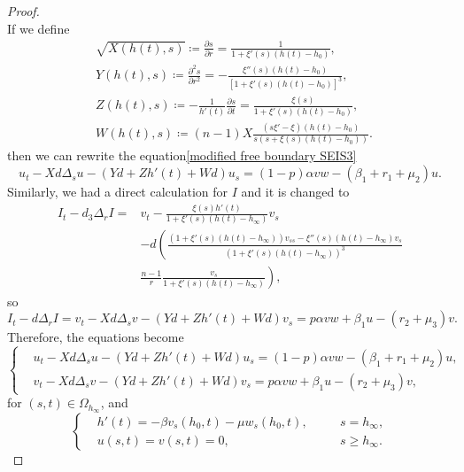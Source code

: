 \documentclass[11pt]{amsart}
\numberwithin{equation}{section}
\theoremstyle{plain}
\theoremstyle{definition}
\begin{document}
\begin{proof}
\begin{equation}
\end{equation}
If we define
\begin{equation*}
	\begin{aligned}
		&\sqrt{X(h(t),s)}\coloneqq \frac{\partial s}{\partial r}=\frac{1}{1+\xi'(s)(h(t)-h_0)},
			\\
		&Y(h(t),s)\coloneqq \frac{\partial^2s}{\partial r^2}=-\frac{\xi''(s)(h(t)-h_0)}{[1+\xi'(s)(h(t)-h_0)]^3},
			\\
		&Z(h(t),s)\coloneqq -\frac{1}{h'(t)}\frac{\partial s}{\partial t}=\frac{\xi(s)}{1+\xi'(s)(h(t)-h_0)},
			\\
		&W(h(t),s)\coloneqq(n-1)X\frac{(s\xi'-\xi)(h(t)-h_0)}{s(s+\xi(s)(h(t)-h_0))}.\,
	\end{aligned}
\end{equation*}
then we can rewrite the equation\cref{modified free boundary SEIS3}
\begin{equation*}
	u_t-Xd\Delta_s u -(Yd+Zh'(t)+Wd)u_s=(1-p)\alpha vw-(\beta_1+r_1+\mu_2)u.
\end{equation*}
Similarly, we had a direct calculation for $I$ and it is changed to
\begin{equation*}
	\begin{aligned}
		I_t-d_3\Delta_r I=&v_t-\frac{\xi(s)h'(t)}{1+\xi'(s)(h(t)-h_\infty)}v_s\\
		&-d\left( \frac{(1+\xi'(s)(h(t)-h_\infty))v_{ss}-\xi''(s)(h(t)-h_\infty)v_s}{(1+\xi'(s)(h(t)-h_\infty))^3} \right. \\
		&\left. \frac{n-1}{r}\frac{v_s}{1+\xi'(s)(h(t)-h_\infty)} \right),
	\end{aligned}
\end{equation*}
so
\begin{equation*}
	I_t-d\Delta_r I = v_t-Xd\Delta_s v-(Yd+Zh'(t)+Wd)v_s=p\alpha vw+\beta_1u-(r_2+\mu_3)v.
\end{equation*}
Therefore, the equations become
\begin{equation*}
	\left \{ \begin{aligned}
		&u_t-Xd\Delta_s u-(Yd+Zh'(t)+Wd)u_s=(1-p)\alpha vw-(\beta_1+r_1+\mu_2)u,\\
		&v_t-Xd\Delta_s v-(Yd+Zh'(t)+Wd)v_s=p\alpha vw+\beta_1 u-(r_2+\mu_3)v,
	\end{aligned} \right.
\end{equation*}
for $(s,t)\in \Omega_{h_\infty}$, and
\begin{equation*}
	\left \{ \begin{aligned}
		&h'(t)=-\beta v_s(h_0,t)-\mu w_s(h_0,t), \quad &&s=h_\infty,\\
		&u(s,t)=v(s,t)=0, &&s\geq h_\infty.
	\end{aligned} \right.
\end{equation*}
\end{proof}
\end{document}
